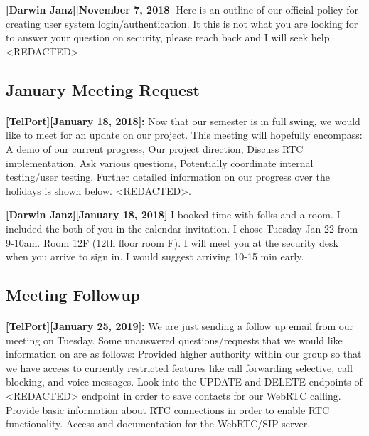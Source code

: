 \documentclass[12pt]{article}
\begin{document}
\textbf{[Darwin Janz][November 7, 2018]} Here is an outline of our official policy for creating user system login/authentication.  It this is not what you are looking for to answer your question on security, please reach back and I will seek help. <REDACTED>.

\subsection{January Meeting Request}

\paragraph{}
\textbf{[TelPort][January 18, 2018]:} Now that our semester is in full swing, we would like to meet for an update on our project. This meeting will hopefully encompass: A demo of our current progress, Our project direction, Discuss RTC implementation, Ask various questions, Potentially coordinate internal testing/user testing. Further detailed information on our progress over the holidays is shown below. <REDACTED>.

\textbf{[Darwin Janz][January 18, 2018]} I booked time with folks and a room.  I included the both of you in the calendar invitation.  I chose Tuesday Jan 22 from 9-10am.  Room 12F (12th floor room F).  I will meet you at the security desk when you arrive to sign in.  I would suggest arriving 10-15 min early.

\subsection{Meeting Followup}

\paragraph{}
\textbf{[TelPort][January 25, 2019]:} We are just sending a follow up email from our meeting on Tuesday. Some unanswered questions/requests that we would like information on are as follows: Provided higher authority within our group so that we have access to currently restricted features like call forwarding selective, call blocking, and voice messages. Look into the UPDATE and DELETE endpoints of <REDACTED> endpoint in order to save contacts for our WebRTC calling. Provide basic information about RTC connections in order to enable RTC functionality. Access and documentation for the WebRTC/SIP server.
\end{document}
